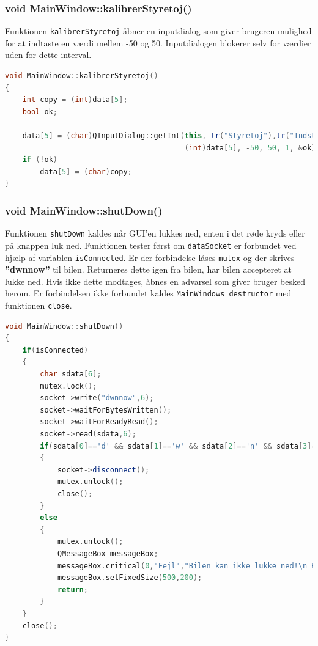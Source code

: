 \subsubsection{void MainWindow::kalibrerStyretoj()}
Funktionen \texttt{kalibrerStyretoj} åbner en inputdialog som giver brugeren mulighed for at indtaste en værdi mellem -50 og 50. Inputdialogen blokerer selv for værdier uden for dette interval.
\begin{lstlisting}[caption={kalibrerStyretoj},label=lst:kalibrerStyretoj, language=c++]
void MainWindow::kalibrerStyretoj()
{
    int copy = (int)data[5];
    bool ok;

    data[5] = (char)QInputDialog::getInt(this, tr("Styretoj"),tr("Indstil styretoj"),
                                         (int)data[5], -50, 50, 1, &ok);
    if (!ok)
        data[5] = (char)copy;
}
\end{lstlisting}

\subsubsection{void MainWindow::shutDown()}
Funktionen \texttt{shutDown} kaldes når GUI'en lukkes ned, enten i det røde kryds eller på knappen luk ned. Funktionen tester først om \texttt{dataSocket} er forbundet ved hjælp af variablen \texttt{isConnected}. Er der forbindelse låses \texttt{mutex} og der skrives \textbf{''dwnnow''} til bilen. Returneres dette igen fra bilen, har bilen accepteret at lukke ned. Hvis ikke dette modtages, åbnes en advarsel som giver bruger besked herom. Er forbindelsen ikke forbundet kaldes \texttt{MainWindows destructor} med funktionen \texttt{close}. 
\begin{lstlisting}[caption={shutDown},label=lst:shutDown, language=c++]
void MainWindow::shutDown()
{
    if(isConnected)
    {
        char sdata[6];
        mutex.lock();
        socket->write("dwnnow",6);
        socket->waitForBytesWritten();
        socket->waitForReadyRead();
        socket->read(sdata,6);
        if(sdata[0]=='d' && sdata[1]=='w' && sdata[2]=='n' && sdata[3]=='n' && sdata[4]=='o' && sdata[5]=='w')
        {
            socket->disconnect();
            mutex.unlock();
            close();
        }
        else
        {
            mutex.unlock();
            QMessageBox messageBox;
            messageBox.critical(0,"Fejl","Bilen kan ikke lukke ned!\n Prøv igen");
            messageBox.setFixedSize(500,200);
            return;
        }
    }
    close();
}
\end{lstlisting}

